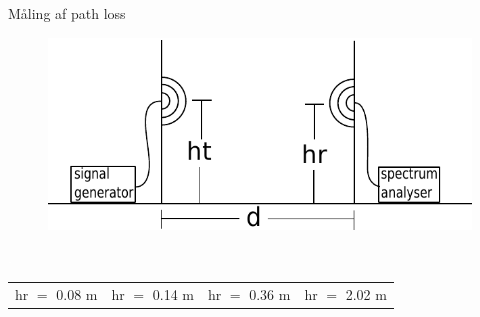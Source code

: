 \def \myvar {0.8 in}
\def \myvara {1.4 in}
\begin{frame}{Måling af path loss}
\begin{minipage}{0.45\textwidth}
\begin{figure}[!htbp]
	\centering
	\vspace{0.9cm}
	\includegraphics[width = \columnwidth]{figures/setup.pdf}\\\vspace{0.5cm}
	
\end{figure}
\end{minipage}%
\begin{minipage}{0.1\textwidth}
\textcolor{white}{.} 
\end{minipage}%
\begin{minipage}{0.45\textwidth}
\begin{figure}[!htbp]
	\centering
	
	
\end{figure}
\end{minipage}
\begin{table}[H]
\centering
\begin{tabular}{cccc}
\textcolor{thomasblue} {hr $=$ 0.08 m} & \textcolor{thomasred} {hr $=$ 0.14 m} & \textcolor{thomasyellow} {hr $=$ 0.36 m} & \textcolor{thomaspurple} {hr $=$ 2.02 m}
\end{tabular}
\end{table}

\end{frame}

